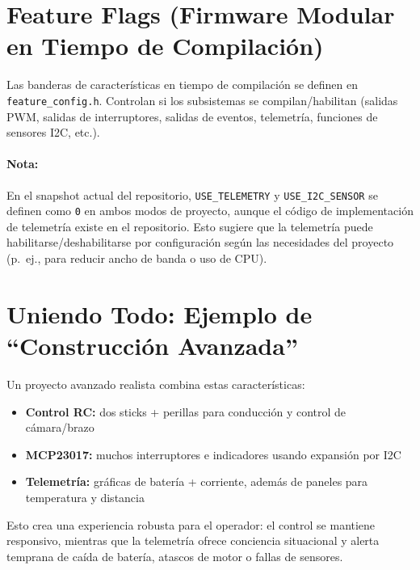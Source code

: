 \section{Feature Flags (Firmware Modular en Tiempo de Compilación)}
\label{sec:feature-flags}

Las banderas de características en tiempo de compilación se definen en \texttt{feature\_config.h}. Controlan si los subsistemas
se compilan/habilitan (salidas PWM, salidas de interruptores, salidas de eventos, telemetría, funciones de sensores I2C, etc.).

\paragraph{Nota:}
En el snapshot actual del repositorio, \texttt{USE\_TELEMETRY} y \texttt{USE\_I2C\_SENSOR} se definen como
\texttt{0} en ambos modos de proyecto, aunque el código de implementación de telemetría existe en el repositorio. Esto sugiere que la telemetría
puede habilitarse/deshabilitarse por configuración según las necesidades del proyecto (p.\ ej., para reducir ancho de banda o uso de CPU).

\section{Uniendo Todo: Ejemplo de ``Construcción Avanzada''}
\label{sec:advanced-build-example}

Un proyecto avanzado realista combina estas características:

\begin{itemize}
    \item \textbf{Control RC:} dos sticks + perillas para conducción y control de cámara/brazo
    \item \textbf{MCP23017:} muchos interruptores e indicadores usando expansión por I2C
    \item \textbf{Telemetría:} gráficas de batería + corriente, además de paneles para temperatura y distancia
\end{itemize}

Esto crea una experiencia robusta para el operador: el control se mantiene responsivo, mientras que la telemetría ofrece
conciencia situacional y alerta temprana de caída de batería, atascos de motor o fallas de sensores.